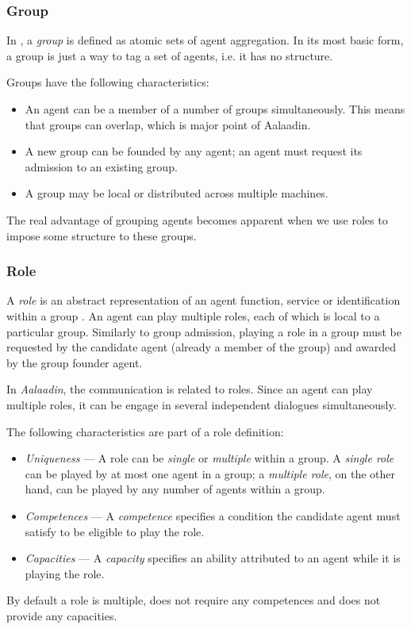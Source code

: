 \subsubsection*{Group}

In \cite{Ferber97}, a \textit{group} is defined as atomic sets of agent aggregation.
In its most basic form, a group is just a way to tag a set of agents, i.e. it has no structure.

Groups have the following characteristics:
\begin{itemize}
	\item An agent can be a member of a number of groups simultaneously.
	This means that groups can overlap, which is major point of Aalaadin.
	\item A new group can be founded by any agent; an agent must request its admission to an existing group.
	\item A group may be local or distributed across multiple machines.
\end{itemize}

The real advantage of grouping agents becomes apparent when we use roles to impose some structure to these groups.

\subsubsection*{Role}

A \textit{role} is an abstract representation of an agent function, service or identification within a group \cite{Ferber97}.
An agent can play multiple roles, each of which is local to a particular group.
Similarly to group admission, playing a role in a group must be requested by the candidate agent (already a member of the group) and awarded by the group founder agent.

In \textit{Aalaadin}, the communication is related to roles. Since an agent can play multiple roles, it can be engage in several independent dialogues simultaneously.

The following characteristics are part of a role definition:
\begin{itemize}
	\item \textit{Uniqueness} ---  A role can be \textit{single} or \textit{multiple} within a group.
	A \textit{single role} can be played by at most one agent in a group; a \textit{multiple role}, on the other hand, can be played by any number of agents within a group. 
	\item \textit{Competences} --- A \textit{competence} specifies a condition the candidate agent must satisfy to be eligible to play the role.
	\item \textit{Capacities} --- A \textit{capacity} specifies an ability attributed to an agent while it is playing the role.
\end{itemize}
By default a role is multiple, does not require any competences and does not provide any capacities.

